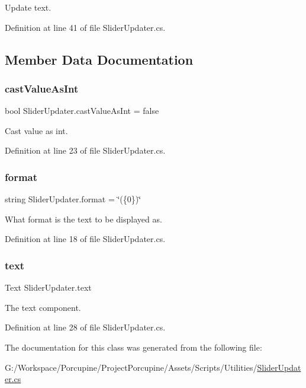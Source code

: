 Update text. 



Definition at line 41 of file Slider\+Updater.\+cs.



\subsection{Member Data Documentation}
\mbox{\label{class_slider_updater_a8b99b814d4e1bdd762695f370a0f9670}} 
\subsubsection{\texorpdfstring{cast\+Value\+As\+Int}{castValueAsInt}}
{\footnotesize\ttfamily bool Slider\+Updater.\+cast\+Value\+As\+Int = false}



Cast value as int. 



Definition at line 23 of file Slider\+Updater.\+cs.

\mbox{\label{class_slider_updater_a5ddaafcb18ae7f53f7e46cc1a5c48e6b}} 
\subsubsection{\texorpdfstring{format}{format}}
{\footnotesize\ttfamily string Slider\+Updater.\+format = \char`\"{}(\{0\})\char`\"{}}



What format is the text to be displayed as. 



Definition at line 18 of file Slider\+Updater.\+cs.

\mbox{\label{class_slider_updater_a898a16c05ade8c926f2a74553d0f85ce}} 
\subsubsection{\texorpdfstring{text}{text}}
{\footnotesize\ttfamily Text Slider\+Updater.\+text}



The text component. 



Definition at line 28 of file Slider\+Updater.\+cs.



The documentation for this class was generated from the following file\+:\begin{DoxyCompactItemize}
\item 
G\+:/\+Workspace/\+Porcupine/\+Project\+Porcupine/\+Assets/\+Scripts/\+Utilities/\hyperlink{_slider_updater_8cs}{Slider\+Updater.\+cs}\end{DoxyCompactItemize}
